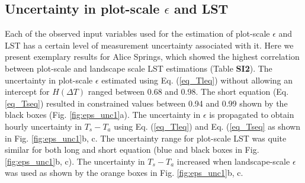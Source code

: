 \documentclass[fleqn,10pt]{wlscirep}
\begin{document}
\subsection{Uncertainty in plot-scale $\epsilon$ and LST}
Each of the observed input variables used for the estimation of plot-scale $\epsilon$ and LST has a certain level of measurement uncertainty associated with it. Here we present exemplary results for Alice Springs, which showed the highest correlation between plot-scale and landscape scale LST estimations (Table \textbf{SI2}). 
The uncertainty in plot-scale $\epsilon$ estimated using Eq. (\ref{eq_Tleq})  without allowing an intercept for $H(\Delta  T)$ ranged between 0.68 and 0.98. The short equation (Eq.\ref{eq_Tseq}) resulted in constrained values between 0.94 and 0.99 shown by the black boxes (Fig. \ref{fig:eps_unc1}a). The uncertainty in $\epsilon$ is propagated to obtain hourly uncertainty in $T_{s} - T_{a}$ using Eq. (\ref{eq_Tleq}) and Eq. (\ref{eq_Tseq} as shown in Fig. \ref{fig:eps_unc1}b, c. The uncertainty range for plot-scale LST was quite similar for both long and short equation (blue and black boxes in Fig. \ref{fig:eps_unc1}b, c). The uncertainty in $T_{s} - T_{a}$ increased when landscape-scale $\epsilon$ was used as shown by the orange boxes in Fig. \ref{fig:eps_unc1}b, c.
 
\end{document}
